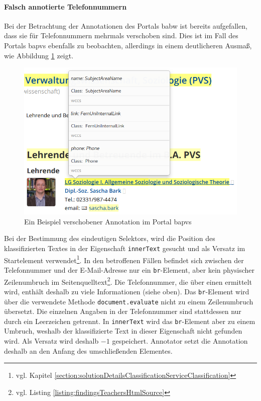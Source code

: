     \paragraph*{Falsch annotierte Telefonnummern}
    Bei der Betrachtung der Annotationen des Portals \gls{babw}
    ist bereits aufgefallen, dass sie für Telefonnummern
    mehrmals verschoben sind.
    Dies ist im Fall des Portals \gls{bapvs} ebenfalls zu beobachten,
    allerdings in einem deutlicheren Ausmaß,
    wie Abbildung \ref{image:findingTeachersBaPVSWrongPhone} zeigt.

    \begin{figure}[htb]
        \centering
        \includegraphics[scale=\screenshotScaleFactor]{../resources/findings/case-study-1/bapvs/annotations/triple-annotation.png}
        \caption{Ein Beispiel verschobener Annotation im Portal \acrshort{bapvs}}
        \label{image:findingTeachersBaPVSWrongPhone}
    \end{figure}

    Bei der Bestimmung des eindeutigen Selektors,
    wird die Position des klassifizierten Textes in der Eigenschaft
    \texttt{innerText} gesucht und als Versatz im Startelement
    verwendet\footnote{vgl. Kapitel \ref{section:solutionDetailsClassificationServiceClassification}}.
    In den betroffenen Fällen befindet sich zwischen der Telefonnummer
    und der E-Mail-Adresse nur ein \texttt{br}-Element,
    aber kein physischer Zeilenumbruch im
    Seitenquelltext\footnote{vgl. Listing \ref{listing:findingsTeachersHtmlSource}}.
    Die Telefonnummer, die über einen {\xpathSelector} ermittelt wird,
    enthält deshalb zu viele Informationen (siehe oben).
    Das \texttt{br}-Element wird über die verwendete Methode \texttt{document.evaluate} nicht zu einem Zeilenumbruch übersetzt.
    Die einzelnen Angaben in der Telefonnummer sind stattdessen nur durch ein Leerzeichen getrennt.
    In \texttt{innerText} wird das \texttt{br}-Element aber zu einem Umbruch,
    weshalb der klassifizierte Text in dieser Eigenschaft nicht gefunden wird.
    Als Versatz wird deshalb $-1$ gespeichert.
    Annotator setzt die Annotation deshalb an den Anfang des umschließenden Elementes.

